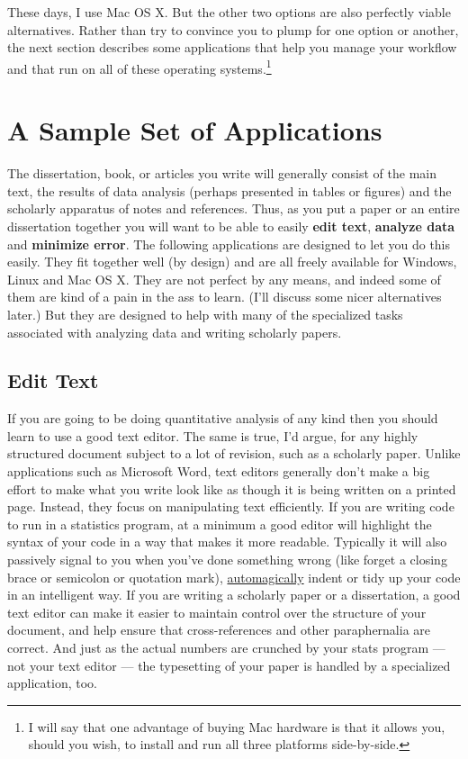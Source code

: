 \documentclass[11pt,article,oneside]{memoir}
\begin{document}
These days, I use Mac OS X. But the other two options are also perfectly viable alternatives. Rather than try to convince you to plump for one option or another, the next section describes some applications that help you manage your workflow and that run on all of these operating systems.\footnote{I will say that one advantage of buying Mac hardware is that it allows you, should you wish, to install and run all three platforms side-by-side.} 


\chapter{A Sample Set of Applications} 

The dissertation, book, or articles you write will generally consist of the main text, the results of data analysis (perhaps presented in tables or figures) and the scholarly apparatus of notes and references. Thus, as you  put a paper or an entire dissertation together you will want to be able to easily \textbf{edit text}, \textbf{analyze data} and \textbf{minimize error}. The following applications are designed to let you do this easily. They fit together well (by design) and are all freely available for Windows, Linux and Mac OS X. They are not perfect by any means, and indeed some of them are kind of a pain in the ass to learn. (I'll discuss some nicer alternatives later.) But they are designed to help with many of the specialized tasks associated with analyzing data and writing scholarly papers.                                                      

\section{Edit Text}
If you are going to be doing quantitative analysis of any kind then you should learn to use a good text editor. The same is true, I'd argue, for any highly structured document subject to a lot of revision, such as a scholarly paper. Unlike applications such as Microsoft Word, text editors generally don't make a big effort to make what you write look like as though it is being written on a printed page. Instead, they focus on manipulating text efficiently. If you are writing code to run in a statistics program, at a minimum a good editor will highlight the syntax of your code in a way that makes it more readable. Typically it will also passively signal to you when you've done something wrong (like forget a closing brace or semicolon or quotation mark), \href{http://en.wiktionary.org/wiki/automagical}{automagically} indent or tidy up your code in an intelligent way. If you are writing a scholarly paper or a dissertation, a good text editor can make it easier to maintain control over the structure of your document, and help ensure that cross-references and other paraphernalia are correct. And just as the actual numbers are crunched by your stats program --- not your text editor --- the typesetting of your paper is handled by a specialized application, too.
\end{document}
